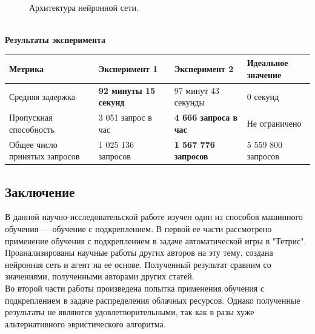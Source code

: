\documentclass{article}
\begin{document}
\begin{figure}[h!]
\caption{Архитектура нейронной сети.}
\label{ris:image}
\end{figure}\\
\textbf{Результаты эксперимента}\\
\begin{tabular}{ | l | l | l | l | }
\hline
Метрика & Эксперимент 1 & Эксперимент 2 & Идеальное значение\\ \hline
Средняя задержка & \textbf{92 минуты 15 секунд} & 97 минут 43 секунды & 0 секунд \\
Пропускная способность & 3 051 запрос в час & \textbf{4 666 запроса в час} & Не ограничено \\
Общее число принятых запросов & 1 025 136 запросов & \textbf{1 567 776 запросов} & 5 559 800 запросов \\
\hline
\end{tabular}
\begin{center}
\section {Заключение}
\end{center}
В данной научно-исследовательской работе изучен один из способов машинного обучения — обучение с подкреплением. В первой ее части рассмотрено применение обучения с подкреплением в задаче автоматической игры в "Тетрис". Проанализированы научные работы других авторов на эту тему, создана нейронная сеть и агент на ее основе. Полученный результат сравним со значениями, полученными авторами других статей.\\
Во второй части работы произведена попытка применения обучения с подкреплением в задаче распределения облачных ресурсов. Однако полученные результаты не являются удовлетворительными, так как в разы хуже альтернативного эвристического алгоритма.\\
\end{document}
